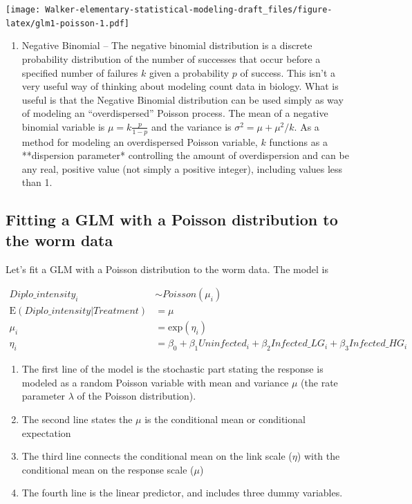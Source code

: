 \documentclass[]{book}
\providecommand{\tightlist}{%
  \setlength{\itemsep}{0pt}\setlength{\parskip}{0pt}}
\begin{document}
\texttt{[image: Walker-elementary-statistical-modeling-draft\_files/figure-latex/glm1-poisson-1.pdf]}

\begin{enumerate}
\def\labelenumi{\arabic{enumi}.}
\setcounter{enumi}{1}
\tightlist
\item
  Negative Binomial -- The negative binomial distribution is a discrete probability distribution of the number of successes that occur before a specified number of failures \(k\) given a probability \(p\) of success. This isn't a very useful way of thinking about modeling count data in biology. What is useful is that the Negative Binomial distribution can be used simply as way of modeling an ``overdispersed'' Poisson process. The mean of a negative binomial variable is \(\mu = k\frac{p}{1-p}\) and the variance is \(\sigma^2 = \mu + \mu^2/k\). As a method for modeling an overdispersed Poisson variable, \(k\) functions as a **dispersion parameter* controlling the amount of overdispersion and can be any real, positive value (not simply a positive integer), including values less than 1.
\end{enumerate}

\hypertarget{fitting-a-glm-with-a-poisson-distribution-to-the-worm-data}{%
\subsection{Fitting a GLM with a Poisson distribution to the worm data}\label{fitting-a-glm-with-a-poisson-distribution-to-the-worm-data}}

Let's fit a GLM with a Poisson distribution to the worm data. The model is

\begin{align}
Diplo\_intensity_i &\sim Poisson(\mu_i)\\
\mathrm{E}({Diplo\_intensity|Treatment}) &= \mu\\
\mu_i &= \mathrm{exp}(\eta_i)\\
\eta_i &= \beta_0 + \beta_1 Uninfected_i + \beta_2 Infected\_LG_i + \beta_3 Infected\_HG_i
\end{align}

\begin{enumerate}
\def\labelenumi{\arabic{enumi}.}
\tightlist
\item
  The first line of the model is the stochastic part stating the response is modeled as a random Poisson variable with mean and variance \(\mu\) (the rate parameter \(\lambda\) of the Poisson distribution).
\item
  The second line states the \(\mu\) is the conditional mean or conditional expectation
\item
  The third line connects the conditional mean on the link scale (\(\eta\)) with the conditional mean on the response scale (\(\mu\))
\item
  The fourth line is the linear predictor, and includes three dummy variables.
\end{enumerate}
\end{document}
